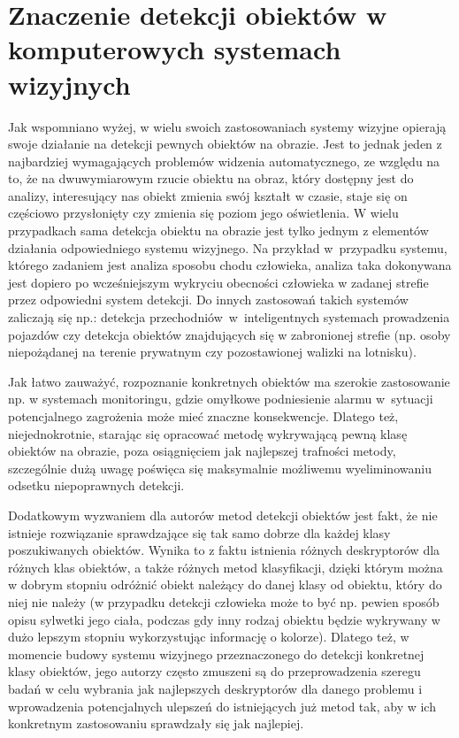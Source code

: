 
\section{Znaczenie detekcji obiektów w komputerowych systemach wizyjnych}
\label{sec:detekcjaWSystemach}

Jak wspomniano wyżej, w wielu swoich zastosowaniach systemy wizyjne opierają swoje działanie na detekcji pewnych obiektów na obrazie.
Jest to jednak jeden z najbardziej wymagających problemów widzenia automatycznego, ze względu na to, że na dwuwymiarowym rzucie obiektu na obraz, który dostępny jest do analizy, interesujący nas obiekt zmienia swój kształt w czasie, staje się on częściowo przysłonięty czy zmienia się poziom jego oświetlenia.
W wielu przypadkach sama detekcja obiektu na obrazie jest tylko jednym z elementów działania odpowiedniego systemu wizyjnego. Na przykład w~przypadku systemu, którego zadaniem jest analiza sposobu chodu człowieka, analiza taka dokonywana jest dopiero po wcześniejszym wykryciu obecności człowieka w zadanej strefie przez odpowiedni system detekcji.
Do innych zastosowań takich systemów zaliczają się np.: detekcja przechodniów~w~inteligentnych systemach prowadzenia pojazdów czy detekcja obiektów znajdujących się w zabronionej strefie (np. osoby niepożądanej na terenie prywatnym czy pozostawionej walizki na lotnisku).

Jak łatwo zauważyć, rozpoznanie konkretnych obiektów ma szerokie zastosowanie np. w systemach monitoringu, gdzie omyłkowe podniesienie alarmu w~sytuacji potencjalnego zagrożenia może mieć znaczne konsekwencje. Dlatego też, niejednokrotnie, starając się opracować metodę wykrywającą pewną klasę obiektów na obrazie, poza osiągnięciem jak najlepszej trafności metody, szczególnie dużą uwagę poświęca się maksymalnie możliwemu wyeliminowaniu odsetku niepoprawnych detekcji.

Dodatkowym wyzwaniem dla autorów metod detekcji obiektów jest fakt, że nie istnieje rozwiązanie sprawdzające się tak samo dobrze dla każdej klasy poszukiwanych obiektów. Wynika to z faktu istnienia różnych deskryptorów dla różnych klas obiektów, a także różnych metod klasyfikacji, dzięki którym można w dobrym stopniu odróżnić obiekt należący do danej klasy od obiektu, który do niej nie należy (w przypadku detekcji człowieka może to być np. pewien sposób opisu sylwetki jego ciała, podczas gdy inny rodzaj obiektu będzie wykrywany w dużo lepszym stopniu wykorzystując informację o kolorze). Dlatego też, w momencie budowy systemu wizyjnego przeznaczonego do detekcji konkretnej klasy obiektów, jego autorzy często zmuszeni są do przeprowadzenia szeregu badań w celu wybrania jak najlepszych deskryptorów dla danego problemu i wprowadzenia potencjalnych ulepszeń do istniejących już metod tak, aby w ich konkretnym zastosowaniu sprawdzały się jak najlepiej.

